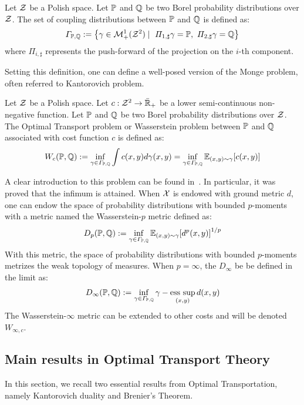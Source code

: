 \begin{definition} 
    Let $\mathcal{Z}$ be a Polish space. Let $\mathbb{P}$ and $\mathbb{Q}$ be two Borel probability distributions over $\mathcal{Z}$. The set of coupling distributions between $\mathbb{P}$ and $\mathbb{Q}$ is defined as:
    \begin{align*}
        \Gamma_{\PP,\QQ}:=\left\{\gamma\in\mathcal{M}^1_+(\ZZ^2)\mid~ \Pi_{1,\sharp}\gamma = \PP,~\Pi_{2,\sharp}\gamma = \QQ\right\}
    \end{align*}
where $\Pi_{i,\sharp}$ represents the push-forward of the projection on the $i$-th component.
\end{definition}
Setting this definition, one can define a well-posed version of the Monge problem, often referred to Kantorovich problem.
\begin{definition}
Let $\mathcal{Z}$ be a Polish space. Let $c:\mathcal{Z}^2\to\bar{\mathbb{R}}_+$ be a lower semi-continuous non-negative function. Let $\mathbb{P}$ and $\mathbb{Q}$ be two  Borel probability distributions over $\mathcal{Z}$. The Optimal Transport problem or Wasserstein problem between $\mathbb{P}$ and $\mathbb{Q}$ associated with cost function $c$ is defined as:
\begin{align*}
    W_c(\PP,\QQ):=\inf_{\gamma\in\Gamma_{\PP,\QQ}}\int c(x,y) d\gamma(x,y) = \inf_{\gamma\in\Gamma_{\PP,\QQ}}\mathbb{E}_{(x,y)\sim\gamma}\left[c(x,y) \right]
\end{align*} 
\end{definition}
A clear introduction to this problem can be found in~\cite{villani2003topics}. In particular, it was proved that the infimum is attained. When $\mathcal{X}$ is endowed with ground metric $d$, one can endow the space of probability distributions with bounded $p$-moments with a metric named the Wasserstein-$p$ metric defined as:
\begin{align*}
    D_p(\PP,\QQ):=\inf_{\gamma\in\Gamma_{\PP,\QQ}}\mathbb{E}_{(x,y)\sim\gamma}\left[d^p(x,y) \right]^{1/p}
\end{align*}
With this metric, the space of probability distributions with bounded $p$-moments metrizes the weak topology of measures. When $p=\infty$, the $D_\infty$ be be defined in the limit as:
\begin{align*}
    D_\infty(\mathbb{P},\mathbb{Q}):=\inf_{\gamma\in\Gamma_{\mathbb{P},\mathbb{Q}}}\gamma-\operatorname*{ess\text{ }sup}_{(x,y)} d(x,y) 
\end{align*}
The Wasserstein-$\infty$ metric can be extended to other costs and will be denoted $W_{\infty,c}$.
\subsection{Main results in Optimal Transport Theory} 
In this section, we recall two essential results from Optimal Transportation, namely Kantorovich duality and Brenier's Theorem.
